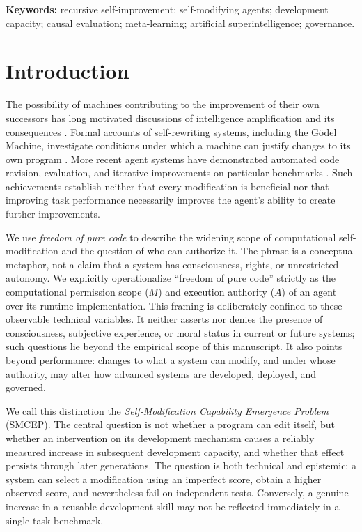 \documentclass[11pt,a4paper]{article}
\begin{document}
\noindent\textbf{Keywords:} recursive self-improvement; self-modifying agents; development capacity; causal evaluation; meta-learning; artificial superintelligence; governance.
\tableofcontents\newpage

\section{Introduction}
The possibility of machines contributing to the improvement of their own successors has long motivated discussions of intelligence amplification and its consequences \cite{good1965,bostrom2014}. Formal accounts of self-rewriting systems, including the G\"odel Machine, investigate conditions under which a machine can justify changes to its own program \cite{schmidhuber2006}. More recent agent systems have demonstrated automated code revision, evaluation, and iterative improvements on particular benchmarks \cite{robeyns2025,zhang2026,srikanth2026}. Such achievements establish neither that every modification is beneficial nor that improving task performance necessarily improves the agent's ability to create further improvements.

We use \emph{freedom of pure code} to describe the widening scope of computational self-modification and the question of who can authorize it. The phrase is a conceptual metaphor, not a claim that a system has consciousness, rights, or unrestricted autonomy. We explicitly operationalize ``freedom of pure code'' strictly as the computational permission scope (\(M\)) and execution authority (\(A\)) of an agent over its runtime implementation. This framing is deliberately confined to these observable technical variables. It neither asserts nor denies the presence of consciousness, subjective experience, or moral status in current or future systems; such questions lie beyond the empirical scope of this manuscript. It also points beyond performance: changes to what a system can modify, and under whose authority, may alter how advanced systems are developed, deployed, and governed.\par

We call this distinction the \emph{Self-Modification Capability Emergence Problem} (SMCEP). The central question is not whether a program can edit itself, but whether an intervention on its development mechanism causes a reliably measured increase in subsequent development capacity, and whether that effect persists through later generations. The question is both technical and epistemic: a system can select a modification using an imperfect score, obtain a higher observed score, and nevertheless fail on independent tests. Conversely, a genuine increase in a reusable development skill may not be reflected immediately in a single task benchmark.
\end{document}
